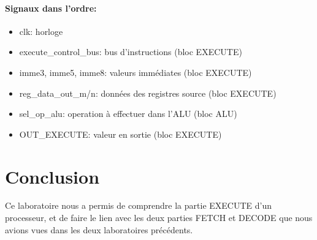 \documentclass[a4paper]{article} %
\begin{document}
\paragraph{Signaux dans l'ordre:}
\begin{itemize}
    \item     clk: horloge
    \item     execute\_control\_bus: bus d'instructions (bloc EXECUTE)
    \item     imme3, imme5, imme8: valeurs immédiates (bloc EXECUTE)
    \item     reg\_data\_out\_m/n: données des registres source (bloc EXECUTE)
    \item     sel\_op\_alu: operation à effectuer dans l'ALU (bloc ALU)
    \item     OUT\_EXECUTE: valeur en sortie (bloc EXECUTE)
\end{itemize}
\section{Conclusion}
Ce laboratoire nous a permis de comprendre la partie EXECUTE d'un processeur, et de faire le lien avec les deux parties FETCH et DECODE que nous avions vues dans les deux laboratoires précédents.
\end{document}
